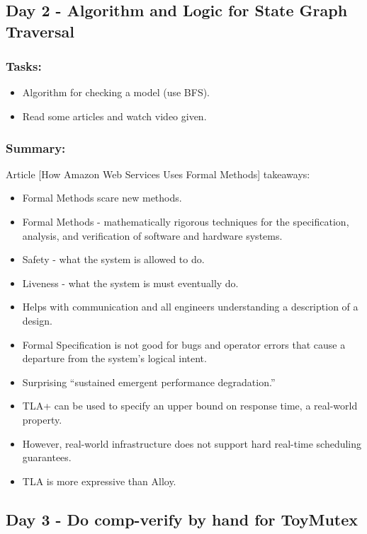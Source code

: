 \documentclass[11pt]{article}
\begin{document}
\subsection{Day 2 - Algorithm and Logic for State Graph Traversal}

\subsubsection*{Tasks:}
\begin{itemize}
  \item Algorithm for checking a model (use BFS).
  \item Read some articles and watch video given.
\end{itemize}

\subsubsection*{Summary:}
Article [How Amazon Web Services Uses Formal Methods] takeaways:
\begin{itemize}
  \item Formal Methods scare new methods.
  \item Formal Methods - mathematically rigorous techniques for the specification, analysis, and verification of software and hardware systems. 
  \item Safety - what the system is allowed to do.
  \item Liveness  - what the system is must eventually do.
  \item Helps with communication and all engineers understanding a description of a design.
  \item Formal Specification is not good for bugs and operator errors that cause a departure from the system’s logical intent.
  \item Surprising “sustained emergent performance degradation.”
  \item TLA+ can be used to specify an upper bound on response time, a real-world property.
  \item However, real-world infrastructure does not support hard real-time scheduling guarantees.
  \item TLA is more expressive than Alloy.
\end{itemize}
\subsection{Day 3 - Do comp-verify by hand for ToyMutex}
\end{document}
